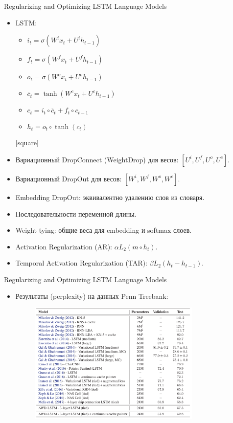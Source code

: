 \begin{frame}[c]{Regularizing and Optimizing LSTM Language Models}
  \begin{itemize}
	[square]
	\item LSTM:
	\begin{itemize}
		[circle]
		\item $i_t = \sigma\left(W^ix_t + U^ih_{t-1}\right)$
		\item $f_t = \sigma\left(W^fx_t + U^fh_{t-1}\right)$
		\item $o_t = \sigma\left(W^ox_t + U^oh_{t-1}\right)$
		\item $\overline{c}_t = \tanh\left(W^cx_t + U^ch_{t-1}\right)$	
		\item $c_t = i_t \circ \overline{c}_t + f_t \circ c_{t-1}$
		\item $h_t = o_t \circ \tanh\left(c_t\right)$
	\end{itemize}
	[square]
	\item Вариационный DropConnect (WeightDrop) для весов: $\left[U^i, U^f, U^o, U^c\right].$ 
	\item Вариационный DropOut для весов: $\left[W^i, W^f, W^o, W^c\right].$ 
	\item Embedding DropOut: эквивалентно удалению слов из словаря. 
	\item Последовательности переменной длины.
	\item Weight tying: общие веса для embedding и softmax слоев.
	\item Activation Regularization (AR): $\alpha L_2(m \circ h_t)$.
	\item Temporal Activation Regularization (TAR): $\beta L_2(h_t - h_{t-1})$.
\end{itemize}
\end{frame}

\begin{frame}[c]{Regularizing and Optimizing LSTM Language Models}
\begin{itemize}
	[square]
	\item Результаты (perplexity) на данных Penn Treebank:
	\begin{figure}
		\centering
		\includegraphics[width=0.8\textwidth]{figures/awdres.png}
	\end{figure}
\end{itemize}
\end{frame}

